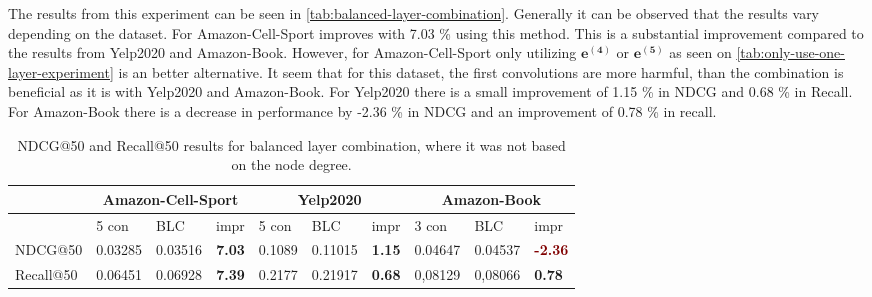 The results from this experiment can be seen in \autoref{tab:balanced-layer-combination}.
Generally it can be observed that the results vary depending on the dataset.
For Amazon-Cell-Sport improves with 7.03 \% using this method.
This is a substantial improvement compared to the results from Yelp2020 and Amazon-Book.
However, for Amazon-Cell-Sport only utilizing $\mathbf{e^{(4)}}$ or $\mathbf{e^{(5)}}$ as seen on \autoref{tab:only-use-one-layer-experiment} is an better alternative.
It seem that for this dataset, the first convolutions are more harmful, than the combination is beneficial as it is with Yelp2020 and Amazon-Book.
For Yelp2020 there is a small improvement of 1.15 \% in NDCG and 0.68 \% in Recall.
For Amazon-Book there is a decrease in performance by -2.36 \% in NDCG and an improvement of 0.78 \% in recall.

\begin{table*}[h!]
    \centering
    \begin{tabular}{|l|r|r|r||l|r|r||l|l|l|}
        \hline
                  & \multicolumn{3}{c||}{Amazon-Cell-Sport} & \multicolumn{3}{c||}{Yelp2020} & \multicolumn{3}{c|}{Amazon-Book}                                                                                                                                              \\ \hline
                  & \multicolumn{1}{l|}{5 con}              & \multicolumn{1}{l|}{BLC}       & \multicolumn{1}{l||}{impr}            & 5 con  & \multicolumn{1}{l|}{BLC} & \multicolumn{1}{l||}{impr}            & 3 con   & BLC     & impr                                  \\ \hline
        NDCG@50   & 0.03285                                 & 0.03516                        & \textbf{\textcolor{OliveGreen}{7.03}} & 0.1089 & 0.11015                  & \textbf{\textcolor{OliveGreen}{1.15}} & 0.04647 & 0.04537 & \textbf{\textcolor{Maroon}{-2.36}}    \\ \hline
        Recall@50 & 0.06451                                 & 0.06928                        & \textbf{\textcolor{OliveGreen}{7.39}} & 0.2177 & 0.21917                  & \textbf{\textcolor{OliveGreen}{0.68}} & 0,08129 & 0,08066 & \textbf{\textcolor{OliveGreen}{0.78}} \\ \hline
    \end{tabular}
    \caption{NDCG@50 and Recall@50 results for balanced layer combination, where it was not based on the node degree.}
    \label{tab:balanced-layer-combination}
\end{table*}

